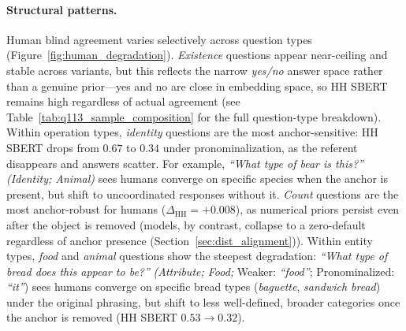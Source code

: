 \documentclass[letterpaper]{article}
\begin{document}
\paragraph{Structural patterns.}
Human blind agreement varies selectively across question types (Figure~\ref{fig:human_degradation}).
\textit{Existence} questions appear near-ceiling and stable across variants, but this reflects the narrow \textit{yes/no} answer space rather than a genuine prior---yes and no are close in embedding space, so HH SBERT remains high regardless of actual agreement (see Table~\ref{tab:q113_sample_composition} for the full question-type breakdown).
Within operation types, \textit{identity} questions are the most anchor-sensitive: HH SBERT
drops from $0.67$ to $0.34$ under pronominalization, as the referent disappears
and answers scatter.
For example, \textit{``What type of bear is this?''} \emph{(Identity; Animal)} sees humans converge on specific
species when the anchor is present, but shift to uncoordinated responses without it.
\textit{Count} questions are the most anchor-robust for humans ($\Delta_{\text{HH}}{=}{+}0.008$), as numerical priors persist even after the object is removed (models, by contrast, collapse to a zero-default regardless of anchor presence (Section~\ref{sec:dist_alignment})).
Within entity types, \textit{food} and \textit{animal} questions show the steepest degradation:
\textit{``What type of bread does this appear to be?''} \emph{(Attribute; Food;} Weaker: \textit{``food''};
Pronominalized: \textit{``it''}) sees humans converge on specific bread types
(\textit{baguette}, \textit{sandwich bread}) under the original phrasing, but shift
to less well-defined, broader categories once the anchor is removed (HH SBERT $0.53 \to 0.32$).

\end{document}
